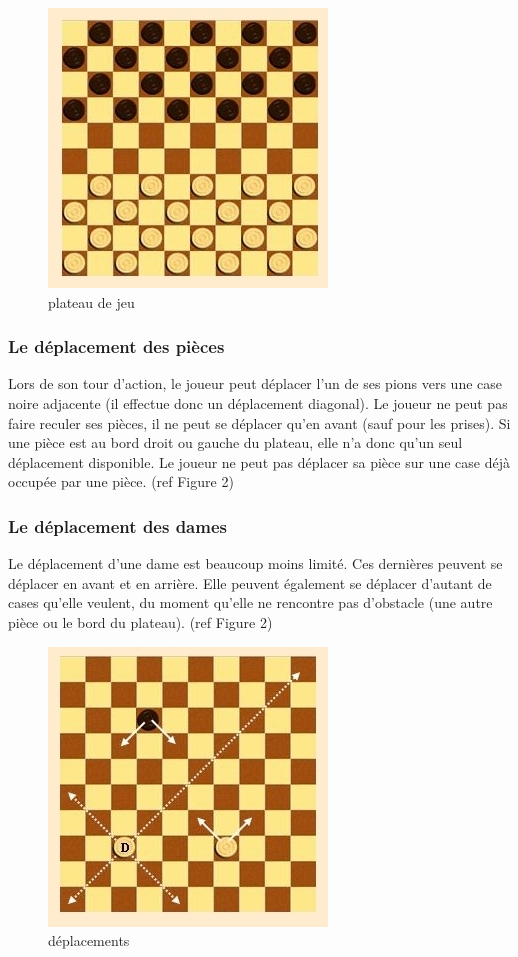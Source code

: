 \documentclass{article}
\begin{document}
        \begin{figure}[!htp]
            \centerline{\includegraphics[scale=0.5]{images/dames.jpg}}
            \caption{\label{étiquette} plateau de jeu}
        \end{figure}
        
    \subsubsection{Le déplacement des pièces}
        Lors de son tour d'action, le joueur peut déplacer l'un de ses pions vers une case noire adjacente (il effectue donc un
        déplacement diagonal). Le joueur ne peut pas faire reculer ses pièces, il ne peut se déplacer qu'en avant (sauf pour 
        les prises). Si une pièce est au bord droit ou gauche du plateau, elle n'a donc qu'un seul déplacement disponible. Le joueur
        ne peut pas déplacer sa pièce sur une case déjà occupée par une pièce. (ref Figure 2)

    \subsubsection{Le déplacement des dames}
        Le déplacement d'une dame est beaucoup moins limité. Ces dernières peuvent se déplacer en avant et en arrière. Elle peuvent
        également se déplacer d'autant de cases qu'elle veulent, du moment qu'elle ne rencontre pas d'obstacle (une autre pièce ou
        le bord du plateau). (ref Figure 2)

        \begin{figure}[!htp]
            \centerline{\includegraphics[scale=0.5]{images/deplacement.jpg}}
            \caption{\label{étiquette} déplacements}
        \end{figure}
\end{document}

